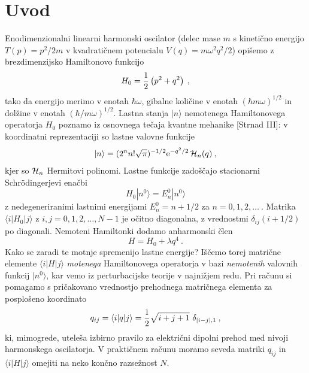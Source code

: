 \documentclass{article}
\begin{document}
\section{Uvod}
Enodimenzionalni linearni harmonski oscilator (delec mase $m$
s kinetično energijo $T(p)=p^2/2m$ v kvadratičnem potencialu
$V(q)=m\omega^2 q^2/2$) opišemo z brezdimenzijsko Hamiltonovo funkcijo
\begin{equation*}
  H_0 = {1\over 2} \left( p^2 + q^2 \right) \>,
\end{equation*}
tako da energijo merimo v enotah $\hbar\omega$, gibalne količine
v enotah $(\hbar m\omega)^{1/2}$ in dolžine v enotah $(\hbar/m\omega)^{1/2}$.
Lastna stanja $|n\rangle$ nemotenega Hamiltonovega operatorja $H_0$
poznamo iz osnovnega tečaja kvantne mehanike [Strnad III]:
v koordinatni reprezentaciji so lastne valovne funkcije
\begin{equation*}
  |n\rangle = (2^n n! \sqrt{\pi})^{-1/2} \mathrm{e}^{-q^2/2}\,  {\cal H}_n (q)\>,
\end{equation*}
kjer so ${\cal H}_n$ Hermitovi polinomi.
Lastne funkcije zadoščajo stacionarni Schr\"odingerjevi enačbi
\begin{equation*}
H_0 | n^0 \rangle = E_n^0 | n^0 \rangle
\end{equation*}
z nedegeneriranimi lastnimi energijami $E_n^0 = n + 1/2$
za $n=0,1,2,\ldots~$.  Matrika $\langle i | H_0 | j\rangle$
z $i,j=0,1,2,\ldots,N-1$ je očitno diagonalna, z vrednostmi
$\delta_{ij}(i + 1/2)$ po diagonali.  Nemoteni Hamiltonki
dodamo anharmonski člen
\begin{equation*}
H = H_0 + \lambda q^4 \>.
\end{equation*}
Kako se zaradi te motnje spremenijo lastne energije?
Iščemo torej matrične elemente $\langle i | H | j\rangle$
{\sl motenega\/} Hamiltonovega operatorja v bazi {\sl nemotenih\/}
valovnih funkcij $| n^0\rangle$, kar vemo iz perturbacijske
teorije v najnižjem redu.  Pri računu si pomagamo
s pričakovano vrednostjo prehodnega matričnega
elementa za posplošeno koordinato
$$
q_{ij} = \langle i | q | j \rangle
       = {1\over 2} \sqrt{i+j+1}\,\, \delta_{|i-j|,1} \>,
$$
ki, mimogrede, uteleša izbirno pravilo za električni dipolni
prehod med nivoji harmonskega oscilatorja.  V praktičnem računu
moramo seveda matriki $q_{ij}$ in $\langle i | H | j\rangle$
omejiti na neko končno razsežnost $N$.
\end{document}
